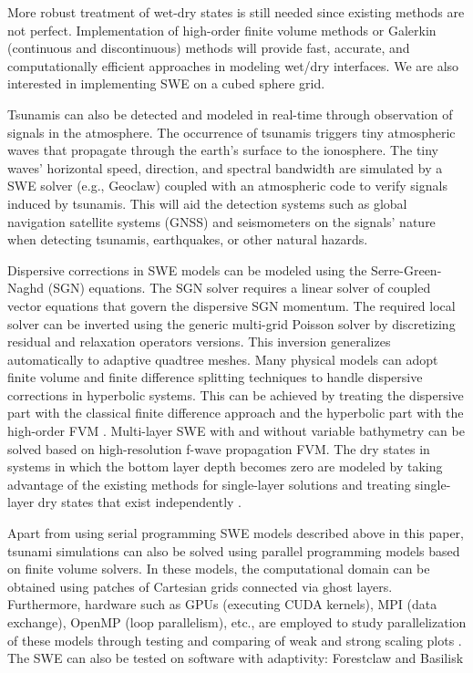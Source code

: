 \documentclass[9pt,a4paper]{article}
\begin{document}
	More robust treatment of wet-dry states is still needed since existing methods are not perfect. Implementation of high-order finite volume methods or Galerkin (continuous and discontinuous) methods will provide fast, accurate, and computationally efficient approaches in modeling wet/dry interfaces. We are also interested in implementing SWE on a cubed sphere grid.
	
	
	
	Tsunamis can also be detected and modeled in real-time through observation of signals in the atmosphere. The occurrence of tsunamis triggers tiny atmospheric waves that propagate through the earth's surface to the ionosphere. The tiny waves' horizontal speed, direction, and spectral bandwidth are simulated by a SWE solver (e.g., Geoclaw)  coupled with an atmospheric code to verify signals induced by tsunamis.  This will aid the detection systems such as global navigation satellite systems (GNSS) and seismometers on the signals' nature when detecting tsunamis, earthquakes, or other natural hazards.
	
	
	
	Dispersive corrections in SWE models can be modeled using the Serre-Green-Naghd (SGN) equations. The SGN solver requires a linear solver of coupled vector equations that govern the dispersive SGN momentum.  The required local solver can be inverted using the generic multi-grid Poisson solver by discretizing residual and relaxation operators versions. This inversion generalizes automatically to adaptive quadtree meshes. Many physical models can adopt finite volume and finite difference splitting techniques to handle dispersive corrections in hyperbolic systems.  This can be achieved by treating the dispersive part with the classical finite difference approach and the hyperbolic part with the high-order FVM \citep{la-bo:2009,po:2020,po:2015}. 
	Multi-layer SWE with and without variable bathymetry can be solved based on high-resolution f-wave propagation FVM. The dry states in systems in which the bottom layer depth becomes zero are modeled by taking advantage of the existing methods for single-layer solutions and treating single-layer dry states that exist independently \citep{mandli2013numerical}.
	
	Apart from using serial programming SWE models described above in this paper, tsunami simulations can also be solved using parallel programming models based on finite volume solvers.  In these models, the computational domain can be obtained using patches of Cartesian grids connected via ghost layers.  Furthermore, hardware such as GPUs (executing CUDA kernels), MPI (data exchange), OpenMP (loop parallelism), etc., are employed to study parallelization of these models through testing and comparing of weak and strong scaling plots \citep{qi-le-mo:2018}.  The SWE can also be tested on software with adaptivity: Forestclaw \citep{ca-bu:2017} and  Basilisk \citep{po:2015}
	
	
	
	
	
	
	
	
	
\end{document}
